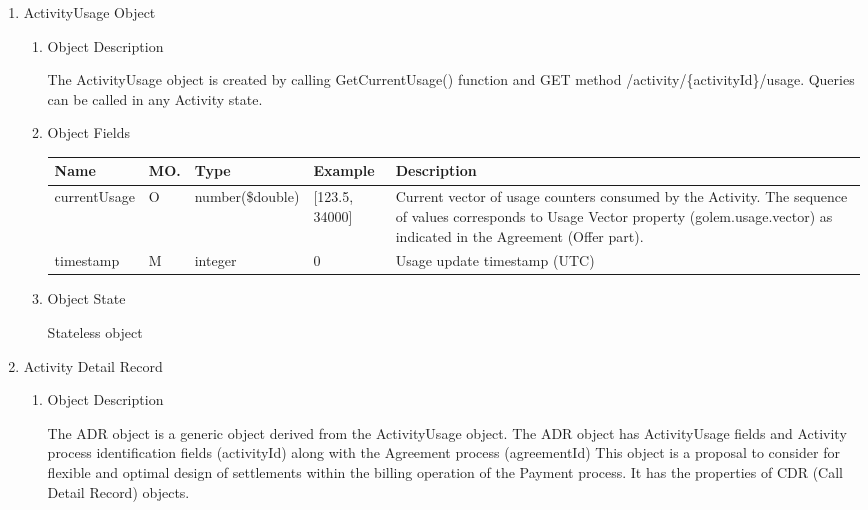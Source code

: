 \begin{enumerate}

\item ActivityUsage Object

\begin{enumerate}

\item Object Description

The ActivityUsage object is created by calling GetCurrentUsage() function
and GET method /activity/\{activityId\}/usage. Queries can be called in any Activity state.

\item Object Fields

\begin{table}[H]
\footnotesize
\begin{center}
\begin{tabular}{|p{3cm}|l|p{3cm}|p{3cm}|p{4cm}|} 
\hline
\rowcolor{lightgray}	Name	& MO.& Type		& Example 	& 	Description \\
\hline

currentUsage 		&  O & number(\$double) 	& [123.5, 34000]	&  	Current vector of usage counters consumed by the Activity. 
																	The sequence of values corresponds to Usage Vector property 
																	(golem.usage.vector) as indicated in the Agreement (Offer part).\\
\hline 		

timestamp 			& M  & integer 			& 	0				& 	Usage update timestamp (UTC) \\
\hline

\end{tabular}
\end{center}
\end{table}

\item Object State

Stateless object

\end{enumerate}

\item Activity Detail Record

\begin{enumerate}

\item Object Description

The ADR object is a generic object derived from the ActivityUsage object.
The ADR object has ActivityUsage fields and Activity process identification fields (activityId) along with the Agreement process (agreementId)
This object is a proposal to consider for flexible and optimal design of settlements within the billing operation of the Payment process.
It has the properties of CDR (Call Detail Record) objects.


\end{enumerate}
\end{enumerate}
